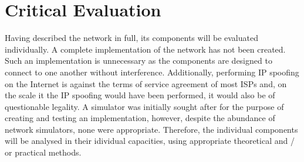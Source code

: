 \documentclass[ %
                    author={Luke Murray},
                supervisor={Dr. Simon Hollis},
                     title={Shadow Peer-to-Peer Networks},
                  subtitle={},
                    degree={MEng},
                      year={2013} ]{thesis}
\begin{document}
\chapter{Critical Evaluation}
\label{chap:evaluation}

Having described the network in full, its components will be evaluated individually. A complete implementation of the network has not been created. Such an implementation is unnecessary as the components are designed to connect to one another without interference. Additionally, performing IP spoofing on the Internet is against the terms of service agreement of most ISPs and, on the scale it the IP spoofing would have been performed, it would also be of questionable legality. A simulator was initially sought after for the purpose of creating and testing an implementation, however, despite the abundance of network simulators, none were appropriate. Therefore, the individual components will be analysed in their idividual capacities, using appropriate theoretical and / or practical methods.
\end{document}
